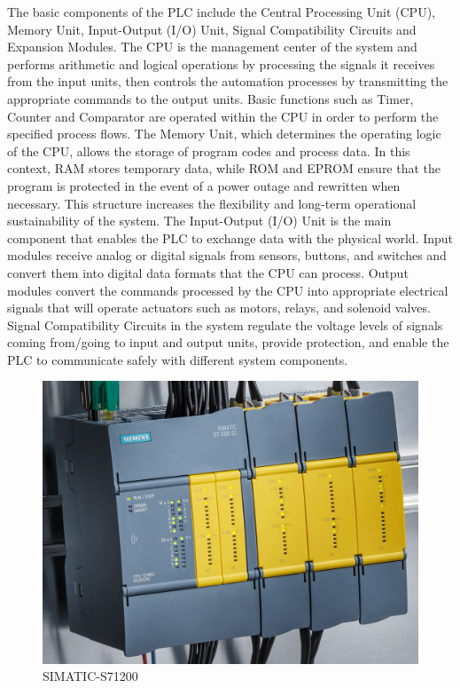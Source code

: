     The basic components of the PLC include the Central Processing Unit (CPU), Memory Unit, Input-Output (I/O) Unit, Signal Compatibility Circuits and Expansion Modules. The CPU is the management center of the system and performs arithmetic and logical operations by processing the signals it receives from the input units, then controls the automation processes by transmitting the appropriate commands to the output units. Basic functions such as Timer, Counter and Comparator are operated within the CPU in order to perform the specified process flows. The Memory Unit, which determines the operating logic of the CPU, allows the storage of program codes and process data. In this context, RAM stores temporary data, while ROM and EPROM ensure that the program is protected in the event of a power outage and rewritten when necessary. This structure increases the flexibility and long-term operational sustainability of the system. The Input-Output (I/O) Unit is the main component that enables the PLC to exchange data with the physical world. Input modules receive analog or digital signals from sensors, buttons, and switches and convert them into digital data formats that the CPU can process. Output modules convert the commands processed by the CPU into appropriate electrical signals that will operate actuators such as motors, relays, and solenoid valves. Signal Compatibility Circuits in the system regulate the voltage levels of signals coming from/going to input and output units, provide protection, and enable the PLC to communicate safely with different system components.

    \begin{figure}[H]
        \centering
        \includegraphics[width=0.8\columnwidth]{imgs/SIMATIC-S7-1200-G2.jpg}
        \caption[Short description for list of figures]{SIMATIC-S71200 }
        \label{fig-magnitude}
        \end{figure}%
    
